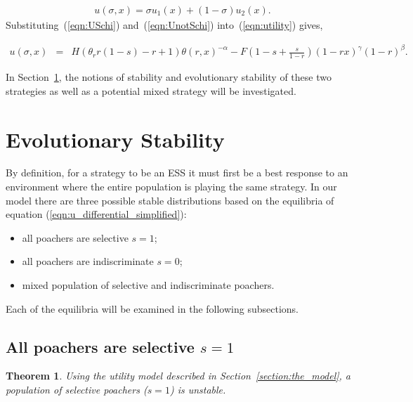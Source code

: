 \documentclass[10pt]{article}
\newtheorem{theorem}{Theorem}
\begin{document}
\begin{eqnarray}
\label{eqn:utility}
u(\sigma, x) = \sigma u_1(x) +(1 - \sigma) u_2(x).
\end{eqnarray}
Substituting~(\ref{eqn:USchi}) and~(\ref{eqn:UnotSchi}) into~(\ref{eqn:utility}) gives,

\begin{eqnarray}
\label{eqn:tutility2}
u(\sigma, x) &=&
H (\theta_r r(1-s) - r + 1)\theta(r,x)^{-\alpha} - F\left(1-s + \frac{s}{1-r} \right)(1-rx)^{\gamma}(1-r)^{\beta} .
\end{eqnarray}

In Section~\ref{section:evolutionary_stability}, the notions of stability
and evolutionary stability of these two strategies as well as a potential 
mixed strategy will be investigated.

\section{Evolutionary Stability}\label{section:evolutionary_stability}

By definition, for a strategy to be an ESS it must first be a best response to an 
environment where the entire population is playing the same strategy.
In our model there are three possible stable distributions based on the
equilibria of equation (\ref{eqn:u_differential_simplified}):

\begin{itemize} 
    \item all poachers are selective \(s=1\);
    \item all poachers are indiscriminate \(s=0\);
    \item mixed population of selective and indiscriminate poachers.
\end{itemize}

Each of the equilibria will be examined in the following subsections.

\subsection{All poachers are selective \(s=1\)}

\begin{theorem}
Using the utility model described in Section~\ref{section:the_model}, 
a population of selective poachers (\(s=1\)) is unstable.
\end{theorem}
\end{document}
